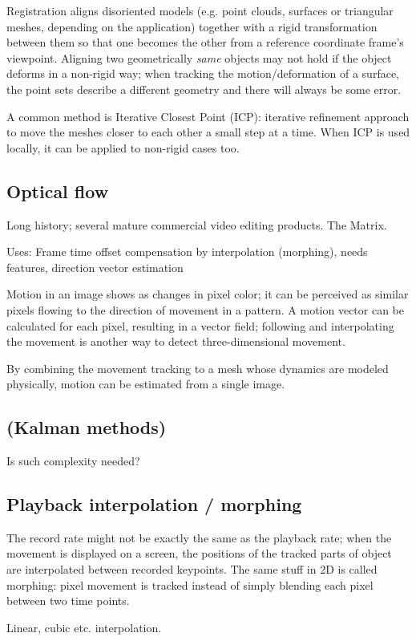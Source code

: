 Registration aligns disoriented models (e.g. point clouds, surfaces or triangular meshes, depending on the application) together with a rigid transformation between them so that one becomes the other from a reference coordinate frame's viewpoint.
Aligning two geometrically \textit{same} objects may not hold if the object deforms in a non-rigid way; when tracking the motion/deformation of a surface, the point sets describe a different geometry and there will always be some error.

A common method is Iterative Closest Point (ICP): iterative refinement approach to move the meshes closer to each other a small step at a time.
When ICP is used locally, it can be applied to non-rigid cases too. \cite{brown2007global}


\subsection{Optical flow} %

Long history; several mature commercial video editing products. The Matrix.

Uses: Frame time offset compensation by interpolation (morphing), needs features, direction vector estimation

Motion in an image shows as changes in pixel color; it can be perceived as similar pixels flowing to the direction of movement in a pattern.
A motion vector can be calculated for each pixel, resulting in a vector field; following and interpolating the movement is another way to detect three-dimensional movement.
\cite{gibson1950perception,horn1981determining,beauchemin1995computation}

By combining the movement tracking to a mesh whose dynamics are modeled physically, motion can be estimated from a single image.
\cite{decarlo1996integration}


\subsection{(Kalman methods)} %

Is such complexity needed?


\subsection{Playback interpolation / morphing} %

The record rate might not be exactly the same as the playback rate; when the movement is displayed on a screen, the positions of the tracked parts of object are interpolated between recorded keypoints.
The same stuff in 2D is called morphing: pixel movement is tracked instead of simply blending each pixel between two time points.

Linear, cubic etc. interpolation.

